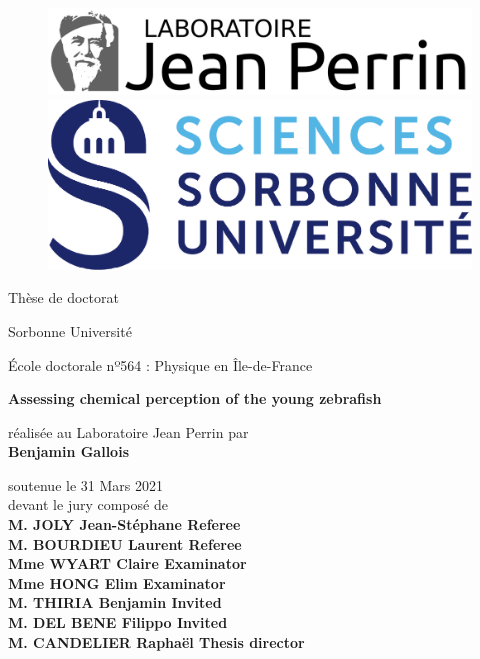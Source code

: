 \thispagestyle{empty}
	
	\begin{figure}[ht]
			\includegraphics[scale=0.5]{cover/ljp.png}
	   \endminipage
			\includegraphics[scale=0.5]{cover/su.png}
		\endminipage
	\end{figure}
	
	\begin{center}
	\vspace{0.3cm}
	\LARGE
	Thèse de doctorat 
	
	\vspace{.1cm}
	\LARGE
	Sorbonne Université

	\vspace{.2cm}
	\Large
  École doctorale nº564 : Physique en Île-de-France
	
	\vspace{1cm}	
	\Large
	\textbf{Assessing chemical perception of the young zebrafish}

	\vspace{1cm}
	\normalsize	
	réalisée au Laboratoire Jean Perrin par \\
	\vspace{.2cm}
	\large
	\textbf{Benjamin Gallois}
	
	\vspace{.3cm}
	\normalsize	
	soutenue le 31 Mars 2021 \\
	\vspace{.1cm}
	\normalsize	
	devant le jury composé de \\
	\vspace{.5cm}
	\large
	\textbf{M. JOLY Jean-Stéphane \hfill Referee} \\
	\textbf{M. BOURDIEU Laurent \hfill Referee} \\
	\textbf{Mme WYART Claire \hfill Examinator} \\
	\textbf{Mme HONG Elim \hfill Examinator} \\
	\textbf{M. THIRIA Benjamin \hfill Invited} \\
	\textbf{M. DEL BENE Filippo \hfill Invited} \\
	\textbf{M. CANDELIER Raphaël \hfill Thesis director} \\
	
	\vspace{1.3cm}
	\end{center}
